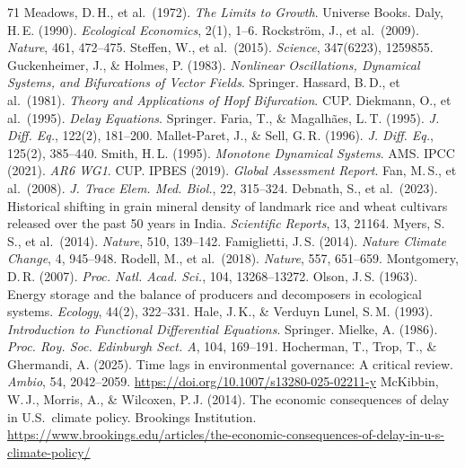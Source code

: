 \documentclass[twocolumn,10pt]{article}
\begin{document}
\begin{thebibliography}{71}
 Meadows, D.\,H., et al.\ (1972). \textit{The Limits to Growth}. Universe Books.
 Daly, H.\,E. (1990). \textit{Ecological Economics}, 2(1), 1--6.
 Rockstr\"om, J., et al.\ (2009). \textit{Nature}, 461, 472--475.
 Steffen, W., et al.\ (2015). \textit{Science}, 347(6223), 1259855.
 Guckenheimer, J., \& Holmes, P. (1983). \textit{Nonlinear Oscillations, Dynamical Systems, and Bifurcations of Vector Fields}. Springer.
 Hassard, B.\,D., et al.\ (1981). \textit{Theory and Applications of Hopf Bifurcation}. CUP.
 Diekmann, O., et al.\ (1995). \textit{Delay Equations}. Springer.
 Faria, T., \& Magalh\~aes, L.\,T. (1995). \textit{J. Diff. Eq.}, 122(2), 181--200.
 Mallet-Paret, J., \& Sell, G.\,R. (1996). \textit{J. Diff. Eq.}, 125(2), 385--440.
 Smith, H.\,L. (1995). \textit{Monotone Dynamical Systems}. AMS.
 IPCC (2021). \textit{AR6 WG1}. CUP.
 IPBES (2019). \textit{Global Assessment Report}.
 Fan, M.\,S., et al.\ (2008). \textit{J. Trace Elem. Med. Biol.}, 22, 315--324.
 Debnath, S., et al.\ (2023). Historical shifting in grain mineral density of landmark rice and wheat cultivars released over the past 50 years in India. \textit{Scientific Reports}, 13, 21164.
 Myers, S.\,S., et al.\ (2014). \textit{Nature}, 510, 139--142.
 Famiglietti, J.\,S. (2014). \textit{Nature Climate Change}, 4, 945--948.
 Rodell, M., et al.\ (2018). \textit{Nature}, 557, 651--659.
 Montgomery, D.\,R. (2007). \textit{Proc. Natl. Acad. Sci.}, 104, 13268--13272.
 Olson, J.\,S. (1963). Energy storage and the balance of producers and decomposers in ecological systems. \textit{Ecology}, 44(2), 322--331.
 Hale, J.\,K., \& Verduyn Lunel, S.\,M. (1993). \textit{Introduction to Functional Differential Equations}. Springer.
 Mielke, A. (1986). \textit{Proc. Roy. Soc. Edinburgh Sect. A}, 104, 169--191.
 Hocherman, T., Trop, T., \& Ghermandi, A. (2025). Time lags in environmental governance: A critical review. \textit{Ambio}, 54, 2042--2059. \url{https://doi.org/10.1007/s13280-025-02211-y}
 McKibbin, W.\,J., Morris, A., \& Wilcoxen, P.\,J. (2014). The economic consequences of delay in U.S.\ climate policy. Brookings Institution. \url{https://www.brookings.edu/articles/the-economic-consequences-of-delay-in-u-s-climate-policy/}

\end{thebibliography}
\end{document}
